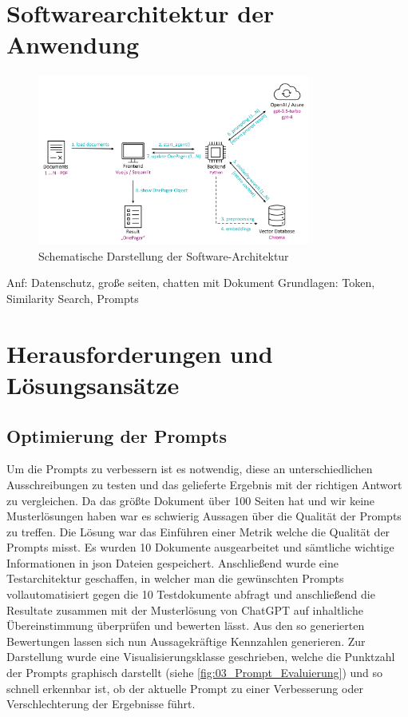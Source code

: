 \section{Softwarearchitektur der Anwendung}

\begin{figure}[ht]
    \centering
    \includegraphics[width=0.8\textwidth]{figures/DokumentenAgent-Uebersicht.png}
    \caption{Schematische Darstellung der Software-Architektur}
    \label{fig:DokumentenAgent-uebersicht}    %
\end{figure}

Anf: Datenschutz, große seiten, chatten mit Dokument
Grundlagen: Token, Similarity Search, Prompts

\section{Herausforderungen und Lösungsansätze}

\subsection{Optimierung der Prompts}
Um die Prompts zu verbessern ist es notwendig, diese an unterschiedlichen Ausschreibungen zu testen und das gelieferte 
Ergebnis mit der richtigen Antwort zu vergleichen. Da das größte Dokument über 100 Seiten hat und wir keine Musterlösungen 
haben war es schwierig Aussagen über die Qualität der Prompts zu treffen. Die Lösung war das Einführen einer Metrik welche 
die Qualität der Prompts misst. Es wurden 10 Dokumente ausgearbeitet und sämtliche wichtige Informationen in json Dateien 
gespeichert. Anschließend wurde eine Testarchitektur geschaffen, in welcher man die gewünschten Prompts vollautomatisiert 
gegen die 10 Testdokumente abfragt und anschließend die Resultate zusammen mit der Musterlösung von ChatGPT auf inhaltliche 
Übereinstimmung überprüfen und bewerten lässt. Aus den so generierten Bewertungen lassen sich nun Aussagekräftige Kennzahlen 
generieren. Zur Darstellung wurde eine Visualisierungsklasse geschrieben, welche die Punktzahl der Prompts graphisch darstellt 
(siehe \ref{fig:03_Prompt_Evaluierung}) und so schnell erkennbar ist, ob der aktuelle Prompt zu einer Verbesserung 
oder Verschlechterung der Ergebnisse führt.

